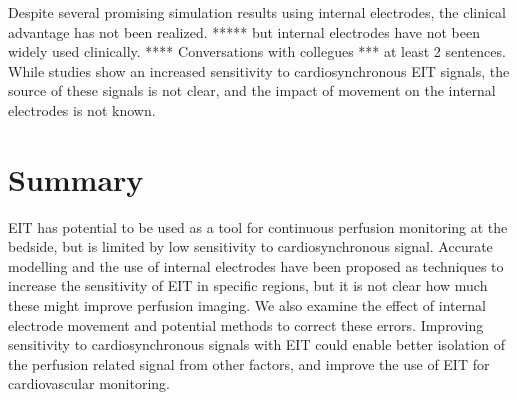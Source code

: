 Despite several promising simulation results using internal electrodes, the clinical advantage
has not been realized. 
*****
but internal electrodes have not been widely used clinically. 
**** Conversations with collegues *** at least 2 sentences.
While studies show an increased sensitivity to cardiosynchronous
EIT signals, the source of these signals is not clear, and the impact of movement 
on the internal electrodes is not known. 

\section{Summary}
EIT has potential to be used as a tool for continuous perfusion monitoring at the bedside,
but is limited by low sensitivity to cardiosynchronous signal. 
Accurate modelling and 
the use of internal electrodes have been proposed as techniques to 
increase the sensitivity of EIT in specific regions, 
but it is not clear how much these might improve perfusion imaging. 
We also examine the effect of internal electrode movement and potential
methods to correct these errors. 
Improving sensitivity to cardiosynchronous signals with EIT could enable 
better isolation of the perfusion related signal from other factors, and 
improve the use of EIT for cardiovascular monitoring. 


%

